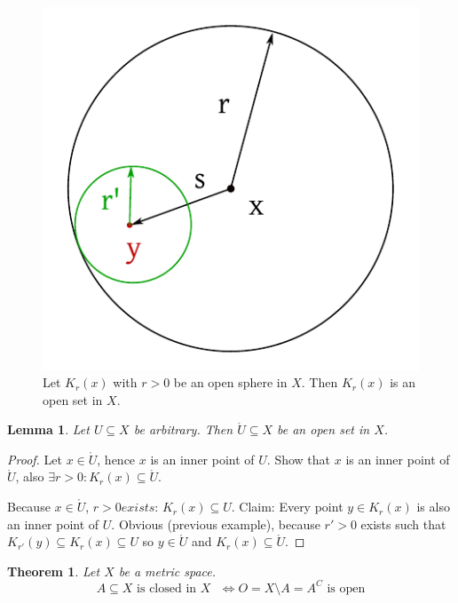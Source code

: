 \documentclass{article}
\newtheorem{theorem}{Theorem}  \numberwithin{theorem}{section}
\newtheorem{lemma}{Lemma}  \numberwithin{lemma}{section}
\begin{document}
\begin{figure}[t]
  \begin{center}
    \includegraphics{img/05_open_sphere.pdf}
    \caption{Let $K_r(x)$ with $r>0$ be an open sphere in $X$. Then $K_r(x)$ is an open set in $X$.}
    \label{img:opensp}
  \end{center}
\end{figure}


\begin{lemma}
  Let $U \subseteq X$ be arbitrary. Then $\mathring{U} \subseteq X$ be an open set in $X$.
\end{lemma}
\begin{proof}
  Let $x \in \mathring{U}$, hence $x$ is an inner point of $U$.
  Show that $x$ is an inner point of $\mathring{U}$, also $\exists r > 0: K_r(x) \subseteq \mathring{U}$.

  Because $x \in \mathring U$, $r > 0 exists$: $K_r(x) \subseteq U$.
  Claim: Every point $y \in K_r(x)$ is also an inner point of $U$.
  Obvious (previous example), because $r' > 0$ exists such that
  $K_{r'}(y) \subseteq K_r(x) \subseteq U$ so $y \in \mathring U$ and $K_r(x) \subseteq \mathring U$.
\end{proof}

\begin{theorem}
  \label{saetzchen1}
  Let $X$ be a metric space.
  \[ A \subseteq X \text{ is closed in $X$ } \iff O = X \setminus A = A^C \text{ is open} \]
\end{theorem}
\end{document}
